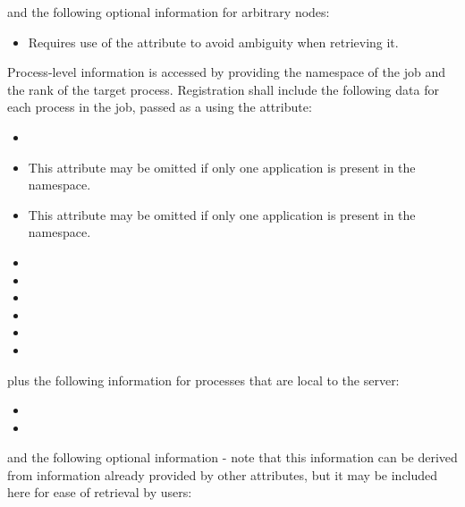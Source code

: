 and the following optional information for arbitrary nodes:

\begin{itemize}
    \item {}Requires use of the  attribute to avoid ambiguity when retrieving it.
    \pasteAttributeItemEnd
\end{itemize}

Process-level information is accessed by providing the namespace of the job and the rank of the target process. Registration shall include the following data for each process in the job, passed as a  using the  attribute:

\begin{itemize}
    \item {}
    \item {}This attribute may be omitted if only one application is present in the namespace.
    \pasteAttributeItemEnd
    \item {}This attribute may be omitted if only one application is present in the namespace.
    \pasteAttributeItemEnd
    \item {}
    \item {}
    \item {}
    \item {}
    \item {}
    \item {}
\end{itemize}

plus the following information for processes that are local to the server:

\begin{itemize}
    \item {}
    \item {}
\end{itemize}

and the following optional information - note that this information can be derived from information already provided by other attributes, but it may be included here for ease of retrieval by users:

